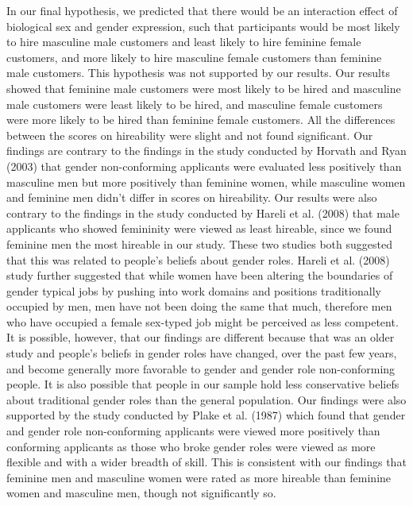 \documentclass[english,man]{apa6}
\theoremstyle{definition}
\theoremstyle{definition}
\theoremstyle{remark}
\begin{document}
In our final hypothesis, we predicted that there would be an interaction
effect of biological sex and gender expression, such that participants
would be most likely to hire masculine male customers and least likely
to hire feminine female customers, and more likely to hire masculine
female customers than feminine male customers. This hypothesis was not
supported by our results. Our results showed that feminine male
customers were most likely to be hired and masculine male customers were
least likely to be hired, and masculine female customers were more
likely to be hired than feminine female customers. All the differences
between the scores on hireability were slight and not found significant.
Our findings are contrary to the findings in the study conducted by
Horvath and Ryan (2003) that gender non-conforming applicants were
evaluated less positively than masculine men but more positively than
feminine women, while masculine women and feminine men didn't differ in
scores on hireability. Our results were also contrary to the findings in
the study conducted by Hareli et al. (2008) that male applicants who
showed femininity were viewed as least hireable, since we found feminine
men the most hireable in our study. These two studies both suggested
that this was related to people's beliefs about gender roles. Hareli et
al. (2008) study further suggested that while women have been altering
the boundaries of gender typical jobs by pushing into work domains and
positions traditionally occupied by men, men have not been doing the
same that much, therefore men who have occupied a female sex-typed job
might be perceived as less competent. It is possible, however, that our
findings are different because that was an older study and people's
beliefs in gender roles have changed, over the past few years, and
become generally more favorable to gender and gender role non-conforming
people. It is also possible that people in our sample hold less
conservative beliefs about traditional gender roles than the general
population. Our findings were also supported by the study conducted by
Plake et al. (1987) which found that gender and gender role
non-conforming applicants were viewed more positively than conforming
applicants as those who broke gender roles were viewed as more flexible
and with a wider breadth of skill. This is consistent with our findings
that feminine men and masculine women were rated as more hireable than
feminine women and masculine men, though not significantly so.
\end{document}
